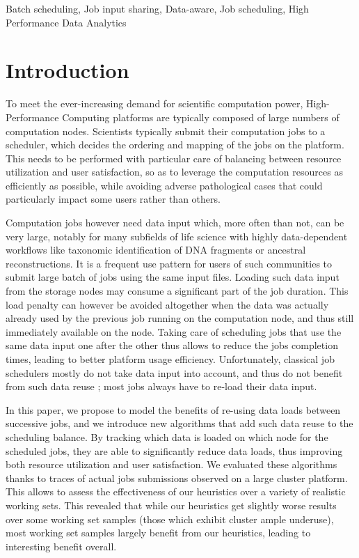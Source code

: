 \documentclass[conference]{IEEEtran}
\begin{document}
\begin{IEEEkeywords}
Batch scheduling,
Job input sharing,
Data-aware,
Job scheduling,
High Performance Data Analytics
\end{IEEEkeywords}

\section{Introduction}\label{sec.introduction}

To meet the ever-increasing demand for scientific computation power,
High-Performance Computing platforms are typically composed of large
numbers of computation nodes. Scientists typically submit their
computation jobs to a scheduler, which decides the ordering and mapping
of the jobs on the platform. This needs to be performed with particular
care of balancing between resource utilization and user satisfaction, so
as to leverage the computation resources as efficiently as possible,
while avoiding adverse pathological cases that could particularly impact
some users rather than others.

Computation jobs however need data input which, more often than not, can
be very large, notably for many subfields of life science with highly
data-dependent workflows like taxonomic identification of DNA fragments or ancestral reconstructions. It is a frequent use pattern for users of such communities to submit
large batch of jobs using the same input files.
Loading such data input from the storage
nodes may consume a significant part of the job duration. This load
penalty can however be avoided altogether when the data was actually
already used by the previous job running on the computation node, and
thus still immediately available on the node. Taking care of scheduling
jobs that use the same data input one after the other thus allows to
reduce the jobs completion times, leading to better platform usage
efficiency. Unfortunately, classical job schedulers mostly do not take
data input into account, and thus do not benefit from such data reuse ;
most jobs always have to re-load their data input.

In this paper, we propose to model the benefits of re-using data loads
between successive jobs, and we introduce new algorithms that add such
data reuse to the scheduling balance. By tracking which data is loaded
on which node for the scheduled jobs, they are able to significantly
reduce data loads, thus improving both resource utilization and user
satisfaction. We evaluated these algorithms thanks to traces of actual
jobs submissions observed on a large cluster platform. This allows to
assess the effectiveness of our heuristics over a variety of realistic
working sets. This revealed that while our heuristics get slightly worse
results over some working set samples (those which exhibit cluster ample
underuse), most working set samples largely benefit from our heuristics,
leading to interesting benefit overall.
\end{document}
